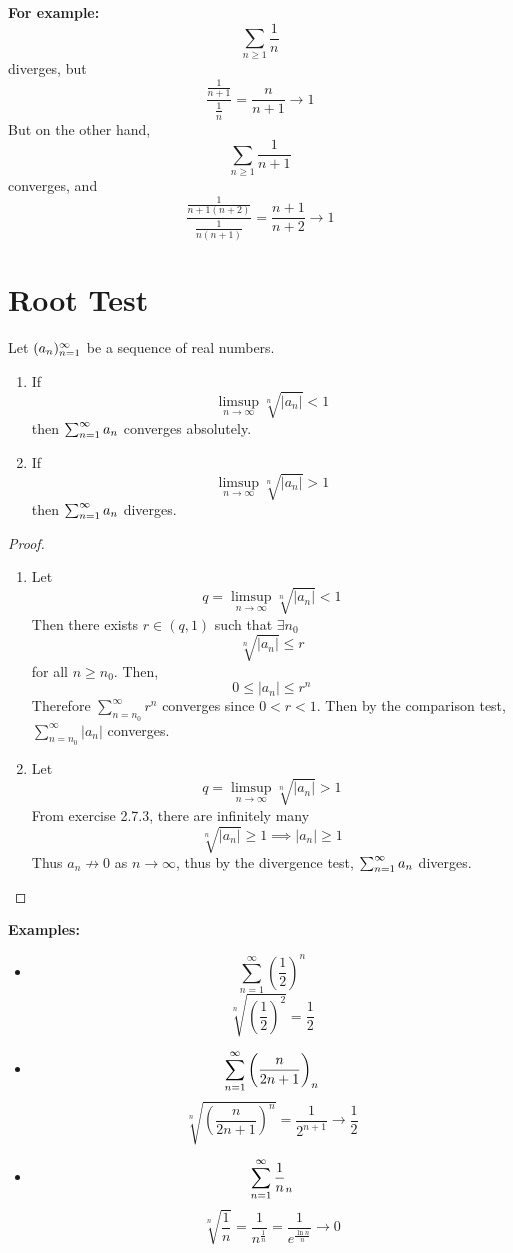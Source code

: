 \documentclass[openany]{report}
\begin{document}
\begin{center}
\end{center}
\textbf{For example:} 
\[\sum_{n\geq 1} \frac{1}{n}\]
diverges, but 
\[\frac{\frac{1}{n+1}}{\frac{1}{n}} = \frac{n}{n+1} \rightarrow 1\]
But on the other hand, 
\[\sum_{n\geq1} \frac{1}{n+1}\]
converges, and 
\[\frac{\frac{1}{n+1(n+2)}}{\frac{1}{n(n+1)}} = \frac{n+1}{n+2} \rightarrow 1\]
\section{Root Test}
\begin{prop}
    Let $({a}_n)_{n=1}^\infty$ be a sequence of real numbers.
    \begin{enumerate}[label=(\roman*)]
        \item If 
        \[\limsup_{n\rightarrow \infty} \sqrt[n]{|a_n|} < 1\]
        then $\sum_{n=1}^\infty a_n$ converges absolutely.
        \item If 
        \[\limsup_{n\rightarrow \infty} \sqrt[n]{|a_n|} > 1\]
        then $\sum_{n=1}^\infty a_n$ diverges.
    \end{enumerate}
\end{prop}

\begin{proof}
    ~\newline
    \begin{enumerate}[label=(\roman*)]
        \item Let 
        \[q = \limsup_{n\rightarrow \infty} \sqrt[n]{|a_n|} < 1\]
        Then there exists $r \in (q,1)$ such that $\exists n_0$ 
        \[\sqrt[n]{|a_n|} \leq r\]
        for all $n \geq n_0$. Then,
        \[0 \leq |a_n| \leq r^n\]
        Therefore $\sum_{n=n_0}^\infty r^n$ converges since $0 < r < 1$. Then by the comparison test, $\sum_{n=n_0}^\infty |a_n|$ converges.
        \item Let
        \[q = \limsup_{n\rightarrow \infty} \sqrt[n]{|a_n|} > 1\]
        From exercise 2.7.3, there are infinitely many 
        \[\sqrt[n]{|a_n|} \geq 1 \implies |a_n| \geq 1\]
        Thus $a_n \not\rightarrow 0$ as $n \rightarrow \infty$, thus by the divergence test, $\sum_{n=1}^\infty a_n$ diverges.
    \end{enumerate}
\end{proof}

\textbf{Examples:}
\begin{itemize}
    \item 
    \[\sum_{n=1}^\infty \left(\frac{1}{2}\right)^n\]
    \[\sqrt[n]{\left(\frac{1}{2}\right)^2} = \frac{1}{2}\]
    \item
    \[\sum_{n=1}^\infty \left(\frac{n}{2n+1}\right)_n\]
    \[\sqrt[n]{\left(\frac{n}{2n+1}\right)^n} = \frac{1}{2^{n+1}} \rightarrow \frac{1}{2}\]
    \item 
    \[\sum_{n=1}^\infty \frac{1}{n}_n\]
    \[\sqrt[n]{\frac{1}{n}} = \frac{1}{n^{\frac{1}{n}}} = \frac{1}{e^{\frac{\ln n}{n}}} \rightarrow 0\]
\end{itemize}
\end{document}
